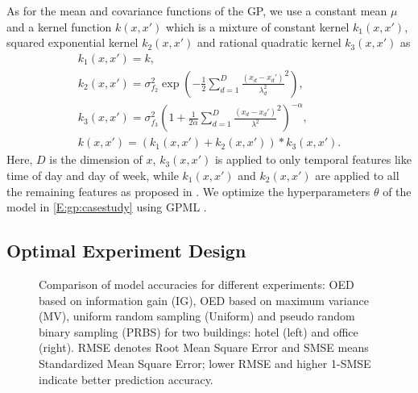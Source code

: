 As for the mean and covariance functions of the GP, %
we use a constant mean \(\mu\) and a kernel function \(k(x,x')\) which is a mixture of constant kernel \(k_1(x,x')\), squared exponential kernel \(k_2(x,x')\) and rational quadratic kernel \(k_3(x,x')\) as
\begin{gather}
k_1(x,x')  = k, \nonumber\\
k_2(x,x') = \sigma_{f_2}^2 \exp \left( -\frac{1}{2} \sum_{d=1}^D \frac{(x_d-x_d')}{{\lambda_d^2}}^2 \right),
 \nonumber\\
 k_3(x,x') = \sigma_{f_3}^2  \left( 1+ \frac{1}{2\alpha} \sum_{d=1}^D \frac{(x_d-x_d')}{{\lambda^2}}^2 \right)^{-\alpha},  \nonumber\\
k(x,x') = \left(k_1(x,x') + k_2(x,x')\right)*k_3(x,x').
\end{gather}
Here, \(D\) is the dimension of \(x\), \(k_3(x,x')\) is applied to only temporal features like time of day and day of week, while \(k_1(x,x')\) and \(k_2(x,x')\) are applied to all the remaining features as proposed in \cite{nghiemetal16gp}.
We optimize the hyperparameters \(\theta\) %
of the model in \eqref{E:gp:casestudy} using GPML \cite{Rasmussen2010}.



\subsection{Optimal Experiment Design}

\begin{figure*}[t]
	\centering
	\setlength{}
	\setlength{}
	
	
	\caption{Comparison of model accuracies for different experiments: OED based on information gain (IG),  OED based on maximum variance (MV), uniform random sampling (Uniform) and pseudo random binary sampling (PRBS) for two buildings: hotel (left) and office (right). RMSE denotes Root Mean Square Error and SMSE means Standardized Mean Square Error; lower RMSE and higher 1-SMSE indicate better prediction accuracy.}
	\captionsetup{justification=centering}
	\label{F:casestudy:oed}
\end{figure*}

